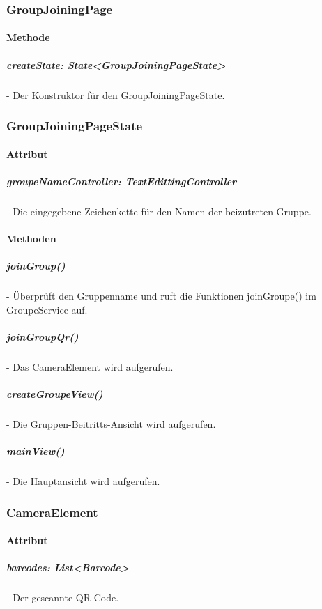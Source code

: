\documentclass[parskip=full]{scrartcl}
\begin{document}
    \subsubsection{GroupJoiningPage}
        \paragraph*{Methode}
            \subparagraph*{createState: State<GroupJoiningPageState>} - Der Konstruktor für den GroupJoiningPageState.
    
    \subsubsection{GroupJoiningPageState}
        \paragraph*{Attribut}
            \subparagraph*{groupeNameController: TextEdittingController} - Die eingegebene Zeichenkette für den Namen der beizutreten Gruppe.

        \paragraph*{Methoden}
            \subparagraph*{joinGroup()} - Überprüft den Gruppenname und ruft die Funktionen joinGroupe() im GroupeService auf.
            \subparagraph*{joinGroupQr()} - Das CameraElement wird aufgerufen.
            \subparagraph*{createGroupeView()} -  Die Gruppen-Beitritts-Ansicht wird aufgerufen.
            \subparagraph*{mainView()} - Die Hauptansicht wird aufgerufen.
    
    \subsubsection*{CameraElement}
        \paragraph*{Attribut}
            \subparagraph*{barcodes: List<Barcode>} -  Der gescannte QR-Code.
    
\end{document}
